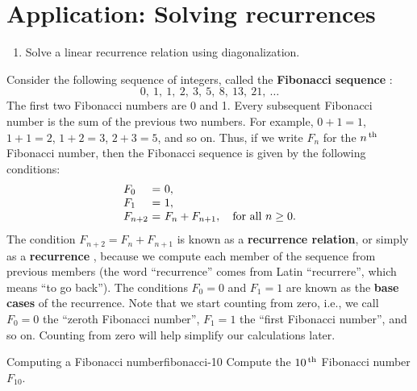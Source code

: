 \section{Application: Solving recurrences}
\label{sec:recurrence}

\begin{outcome}
  \begin{enumerate}
  \item Solve a linear recurrence relation using diagonalization.
  \end{enumerate}
\end{outcome}

Consider the following sequence of integers, called the
\textbf{Fibonacci sequence}%
%
%
:
\begin{equation*}
  0,\ 1,\ 1,\ 2,\ 3,\ 5,\ 8,\ 13,\ 21,\ \ldots
\end{equation*}
The first two Fibonacci numbers are 0 and 1. Every subsequent
Fibonacci number is the sum of the previous two numbers. For example,
$0+1=1$, $1+1=2$, $1+2=3$, $2+3=5$, and so on. Thus, if we write $F_n$ for the
$n^{\,\rm th}$ Fibonacci number, then the Fibonacci sequence is given by the
following conditions:
\begin{equation*}
  \begin{array}{l@{~}c@{~}l}
    F_0 &=& 0, \\
    F_1 &=& 1, \\
    F_{n+2} &=& F_n + F_{n+1}, \quad\mbox{for all $n\geq 0$.} \\
  \end{array}
\end{equation*}
The condition $F_{n+2} = F_n + F_{n+1}$ is known as a
\textbf{recurrence relation}, or simply as a \textbf{recurrence}%
%
, because we compute each
member of the sequence from previous members (the word ``recurrence''
comes from Latin ``recurrere'', which means ``to go back''). The
conditions $F_0=0$ and $F_1=1$ are known as the \textbf{base cases}%
%
 of the recurrence. Note that we
start counting from zero, i.e., we call $F_0=0$ the ``zeroth Fibonacci
number'', $F_1=1$ the ``first Fibonacci number'', and so on. Counting
from zero will help simplify our calculations later.

\begin{example}{Computing a Fibonacci number}{fibonacci-10}
  Compute the $10^{\,\rm th}$ Fibonacci number $F_{10}$.
\end{example}

